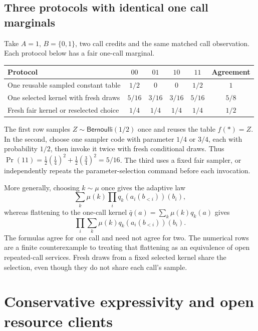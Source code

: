 \documentclass[11pt,a4paper]{article}
\theoremstyle{definition}
\begin{document}
\subsection{Three protocols with identical one call marginals}\label{sec:three-tests}
Take $A=1$, $B=\{0,1\}$, two call credits and the same matched call
observation. Each protocol below has a fair one-call marginal.
\begin{center}
\begin{tabular}{@{}lccccc@{}}
\toprule
Protocol&$00$&$01$&$10$&$11$&Agreement\\
\midrule
One reusable sampled constant table&$1/2$&$0$&$0$&$1/2$&$1$\\
One selected kernel with fresh draws&$5/16$&$3/16$&$3/16$&$5/16$&$5/8$\\
Fresh fair kernel or reselected choice&$1/4$&$1/4$&$1/4$&$1/4$&$1/2$\\
\bottomrule
\end{tabular}
\end{center}
The first row samples $Z\sim\mathsf{Bernoulli}(1/2)$ once and reuses the
table $f(*)=Z$. In the second, choose one sampler code with parameter
$1/4$ or $3/4$, each with probability $1/2$, then invoke it twice with
fresh conditional draws. Thus
$\Pr(11)=\tfrac12(\tfrac14)^2+\tfrac12(\tfrac34)^2=5/16$.
The third uses a fixed fair sampler, or independently repeats the
parameter-selection command before each invocation.

More generally, choosing $k\sim\mu$ once gives the adaptive law
\[
 \sum_k\mu(k)\prod_iq_k(a_i(b_{<i}))(b_i),
\]
whereas flattening to the one-call kernel
$\bar q(a)=\sum_k\mu(k)q_k(a)$ gives
\[
 \prod_i\sum_k\mu(k)q_k(a_i(b_{<i}))(b_i).
\]
The formulas agree for one call and need not agree for two. The numerical
rows are a finite counterexample to treating that flattening as an
equivalence of open repeated-call services. Fresh draws from a fixed
selected kernel share the selection, even though they do not share each
call's sample.
\section{Conservative expressivity and open resource clients}\label{sec:expressivity}
\end{document}
